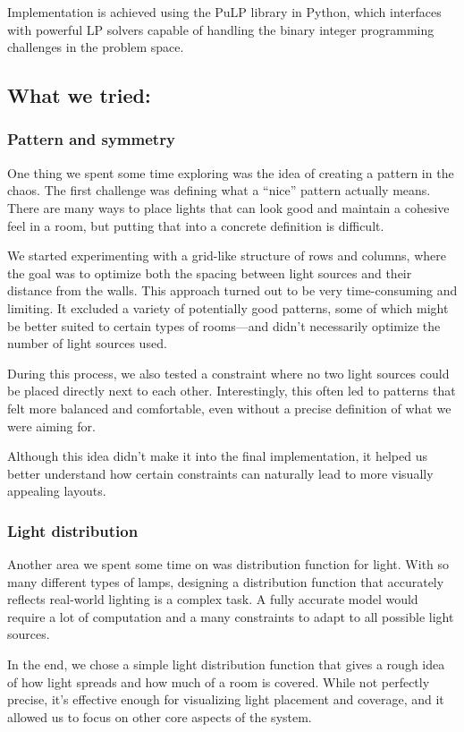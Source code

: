 \documentclass{article}
\begin{document}
Implementation is achieved using the PuLP library in Python, which interfaces with powerful LP solvers capable of handling the binary 
integer programming challenges in the problem space.

\subsection{What we tried: }

\subsubsection{Pattern and symmetry}
One thing we spent some time exploring was the idea of creating a pattern in the chaos. The first challenge was defining what a “nice” pattern actually means. There are many ways to place lights that can look good and maintain a cohesive feel in a room, but putting that into a concrete definition is difficult.

We started experimenting with a grid-like structure of rows and columns, where the goal was to optimize both the spacing between light sources and their distance from the walls. This approach turned out to be very time-consuming and limiting. It excluded a variety of potentially good patterns, some of which might be better suited to certain types of rooms—and didn’t necessarily optimize the number of light sources used.

During this process, we also tested a constraint where no two light sources could be placed directly next to each other. Interestingly, this often led to patterns that felt more balanced and comfortable, even without a precise definition of what we were aiming for.

Although this idea didn’t make it into the final implementation, it helped us better understand how certain constraints can naturally lead to more visually appealing layouts.

\subsubsection{Light distribution}
Another area we spent some time on was distribution function for light. With so many different types of lamps, designing a distribution function that accurately reflects real-world lighting is a complex task. A fully accurate model would require a lot of computation and a many constraints to adapt to all possible light sources.

In the end, we chose a simple light distribution function that gives a rough idea of how light spreads and how much of a room is covered. While not perfectly precise, it’s effective enough for visualizing light placement and coverage, and it allowed us to focus on other core aspects of the system.
\end{document}
